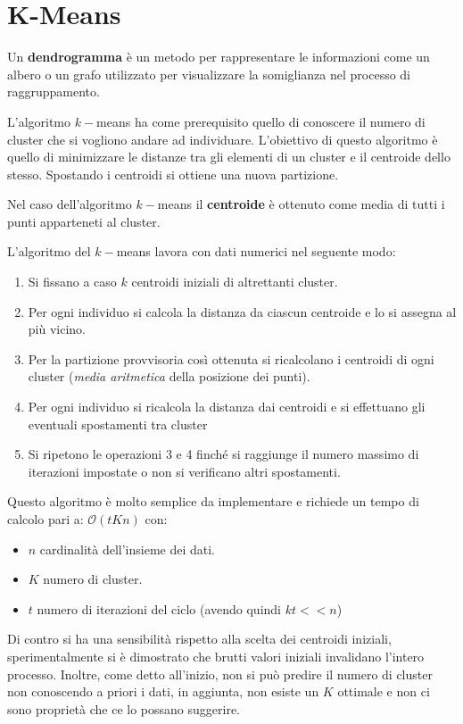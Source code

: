 \section{K-Means}
\begin{definizione}
    Un \textbf{dendrogramma} è un metodo per rappresentare le informazioni come
    un albero o un grafo utilizzato per visualizzare la somiglianza nel processo
    di raggruppamento.
\end{definizione}
L'algoritmo $k-$means ha come prerequisito quello di conoscere il numero di cluster
che si vogliono andare ad individuare. L'obiettivo di questo algoritmo è quello
di minimizzare le distanze tra gli elementi di un cluster e il centroide dello stesso.
Spostando i centroidi si ottiene una nuova partizione.
\begin{definizione}
    Nel caso dell'algoritmo $k-$means il \textbf{centroide} è ottenuto come media
    di tutti i punti apparteneti al cluster.
\end{definizione}
L'algoritmo del $k-$means lavora con dati numerici nel seguente modo:
\begin{enumerate}
    \item Si fissano a caso $k$ centroidi iniziali di altrettanti cluster.
    \item Per ogni individuo si calcola la distanza da ciascun centroide e lo si
          assegna al più vicino.
    \item Per la partizione provvisoria così ottenuta si ricalcolano i centroidi
          di ogni cluster (\textit{media aritmetica} della posizione dei punti).
    \item Per ogni individuo si ricalcola la distanza dai centroidi e si effettuano
          gli eventuali spostamenti tra cluster
    \item Si ripetono le operazioni 3 e 4 finché si raggiunge il numero massimo
          di iterazioni impostate o non si verificano altri spostamenti.
\end{enumerate}
Questo algoritmo è molto semplice da implementare e richiede un tempo di calcolo
pari a: $\mathcal{O}(tKn)$ con:
\begin{itemize}
    \item $n$ cardinalità dell'insieme dei dati.
    \item $K$ numero di cluster.
    \item $t$ numero di iterazioni del ciclo (avendo quindi $kt << n$)
\end{itemize}
Di contro si ha una sensibilità rispetto alla scelta dei centroidi iniziali,
sperimentalmente si è dimostrato che brutti valori iniziali invalidano l'intero
processo. Inoltre, come detto all'inizio, non si può predire il numero di cluster
non conoscendo a priori i dati, in aggiunta, non esiste un $K$ ottimale e non ci sono proprietà
che ce lo possano suggerire.

